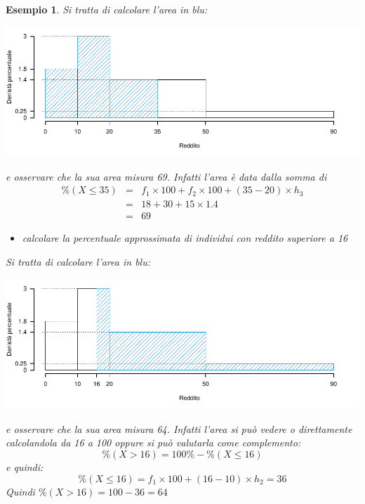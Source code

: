 \documentclass[
  11pt,
]{book}
\providecommand{\tightlist}{%
  \setlength{\itemsep}{0pt}\setlength{\parskip}{0pt}}
\theoremstyle{mytheoremstyle}
\theoremstyle{mydefstyle}
\newtheorem{example}{{Esempio}}[section]
\begin{document}
\begin{example}
Si tratta di calcolare l'area in blu:

\begin{center}\includegraphics{Appunti_di_Statistica_2025_files/figure-latex/decili-g2-1} \end{center}

e osservare che la sua area misura 69. Infatti l'area
è data dalla somma di
\begin{eqnarray*}
\%(X\leq 35) &=& f_1\times 100+f_2\times 100+(35-20)\times h_3 \\
&=& 18+30+15\times 1.4\\
&=& 69
\end{eqnarray*}

\begin{itemize}
\tightlist
\item
  calcolare la percentuale approssimata di individui con reddito superiore a 16
\end{itemize}

Si tratta di calcolare l'area in blu:

\begin{center}\includegraphics{Appunti_di_Statistica_2025_files/figure-latex/decili-g3-1} \end{center}

e osservare che la sua area misura 64.
Infatti l'area si può vedere o direttamente calcolandola da 16 a 100 oppure si
può valutarla come complemento:
\[\%(X>16)=100\%-\%(X\leq 16)\]
e quindi:
\[\%(X\leq 16)=f_1\times 100+(16-10)\times h_2=36\]
Quindi \(\%(X>16)=100-36=64\)


\end{example}
\end{document}
